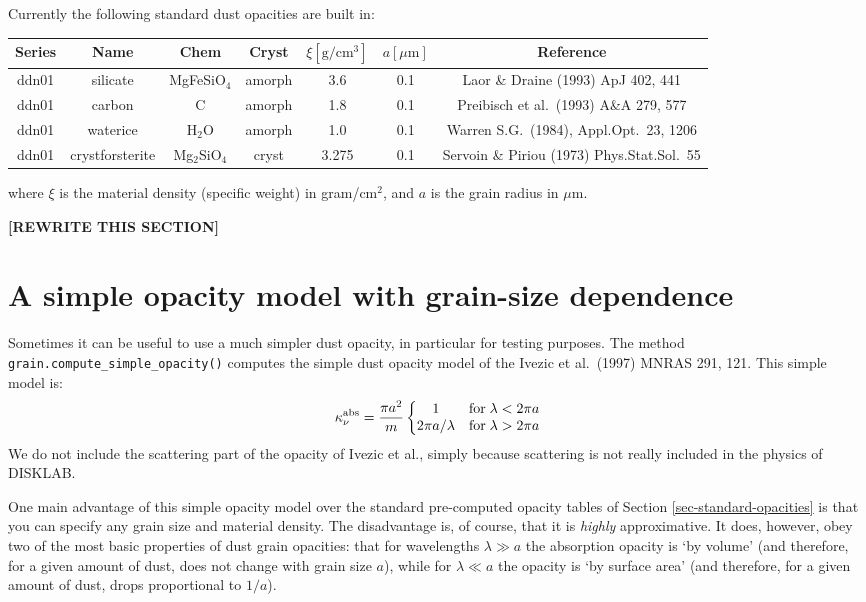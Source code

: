 \documentclass{book}
\newcommand{\code}[1]{{\small\tt #1}}
\begin{document}
Currently the following standard dust opacities are
built in:
\begin{center}
\begin{tabular}{ccccccc}
  Series & Name & Chem & Cryst & $\xi [\mathrm{g}/\mathrm{cm}^3]$ & $a [\mu\mathrm{m}]$ & Reference \\
  \hline
  ddn01  & silicate & MgFeSiO$_4$ & amorph & 3.6 & 0.1 & Laor \& Draine (1993) ApJ 402, 441 \\
  ddn01  & carbon   & C &  amorph & 1.8 & 0.1 & Preibisch et al.\ (1993) A\&A 279, 577 \\
  ddn01  & waterice & H$_2$O &  amorph & 1.0 & 0.1 & Warren S.G.\ (1984), Appl.Opt.\ 23, 1206 \\
  ddn01  & crystforsterite & Mg$_2$SiO$_4$ &  cryst & 3.275 & 0.1 & Servoin \& Piriou (1973) Phys.Stat.Sol.\ 55\\
\end{tabular}
\end{center}
where $\xi$ is the material density (specific weight) in gram/cm$^2$, and
$a$ is the grain radius in $\mu$m.

{\bf [REWRITE THIS SECTION]}

\section{A simple opacity model with grain-size dependence}
\label{sec-dummy-opacity-ivezic}
%
Sometimes it can be useful to use a much simpler dust opacity, in particular for
testing purposes. The method \code{grain.compute\_simple\_opacity()} computes the
simple dust opacity model of the Ivezic et al.~(1997) MNRAS 291, 121.
This simple model is:
\begin{equation}
  \kappa_\nu^{\mathrm{abs}} = \frac{\pi a^2}{m} \left\{
  \begin{matrix}
    1 & \hbox{for}\; \lambda < 2\pi a\\
    2\pi a/\lambda & \hbox{for}\; \lambda > 2\pi a
  \end{matrix}
  \right.
\end{equation}
We do not include the scattering part of the opacity of Ivezic et al., simply
because scattering is not really included in the physics of {\sf DISKLAB}.

One main advantage of this simple opacity model over the standard pre-computed
opacity tables of Section \ref{sec-standard-opacities} is that you can specify
any grain size and material density. The disadvantage is, of course, that it is
{\em highly} approximative. It does, however, obey two of the most basic
properties of dust grain opacities: that for wavelengths $\lambda\gg a$ the
absorption opacity is `by volume' (and therefore, for a given amount of dust,
does not change with grain size $a$), while for $\lambda\ll a$ the opacity is `by
surface area' (and therefore, for a given amount of dust, drops proportional to
$1/a$).
\end{document}
